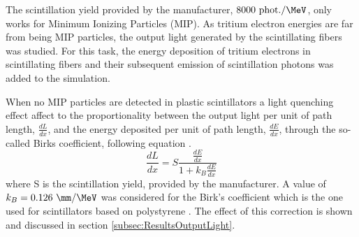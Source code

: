 The scintillation yield provided by the manufacturer, $8000~\text{phot.}/\MeV$, only works for Minimum Ionizing Particles (MIP). As tritium electron energies are far from being MIP particles, the output light generated by the scintillating fibers was studied. For this task, the energy deposition of tritium electrons in scintillating fibers and their subsequent emission of scintillation photons was added to the simulation.

When no MIP particles are detected in plastic scintillators a light quenching effect affect to the proportionality between the output light per unit of path length, $\frac{dL}{dx}$, and the energy deposited per unit of path length, $\frac{dE}{dx}$, through the so-called Birks coefficient, following equation \cite{BirksPaper}.
\begin{equation}
\frac{dL}{dx}= S\frac{\displaystyle{\frac{dE}{dx}}}{1+k_B\displaystyle{\frac{dE}{dx}}}
\label{eq:birkscoefficient}
\end{equation}
where S is the scintillation yield, provided by the manufacturer. A value of $k_B=0.126~\mm/\MeV$ was considered for the Birk's coefficient which is the one used for scintillators based on polystyrene \cite{BirksCoefficient}. The effect of this correction is shown and discussed in section \ref{subsec:ResultsOutputLight}.